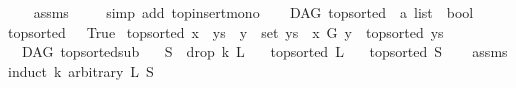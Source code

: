 \begin{isabellebody}
%
\isadelimproof
\ \ %
\endisadelimproof
%
\isatagproof
{}\isamarkupfalse%
\ assms\ \isanewline
\ \ \isamarkupfalse%
\ {\isacharparenleft}{\kern0pt}simp\ add{\isacharcolon}{\kern0pt}\ top{\isacharunderscore}{\kern0pt}insert{\isacharunderscore}{\kern0pt}mono{\isacharparenright}{\kern0pt}%
\endisatagproof
{\isafoldproof}%
%
\isadelimproof
\ \isanewline
%
\endisadelimproof
\isanewline
\isanewline
\isanewline
{}\isamarkupfalse%
\ {\isacharparenleft}{\kern0pt}\ DAG{\isacharparenright}{\kern0pt}\ top{\isacharunderscore}{\kern0pt}sorted\ {\isacharcolon}{\kern0pt}{\isacharcolon}{\kern0pt}\ {\isachardoublequoteopen}{\isacharprime}{\kern0pt}a\ list\ {\isasymRightarrow}\ bool{\isachardoublequoteclose}\ \isanewline
{\isachardoublequoteopen}top{\isacharunderscore}{\kern0pt}sorted\ {\isacharbrackleft}{\kern0pt}{\isacharbrackright}{\kern0pt}\ {\isacharequal}{\kern0pt}\ True{\isachardoublequoteclose}\ {\isacharbar}{\kern0pt}\isanewline
{\isachardoublequoteopen}top{\isacharunderscore}{\kern0pt}sorted\ {\isacharparenleft}{\kern0pt}x\ {\isacharhash}{\kern0pt}\ ys{\isacharparenright}{\kern0pt}\ {\isacharequal}{\kern0pt}\ {\isacharparenleft}{\kern0pt}{\isacharparenleft}{\kern0pt}{\isasymforall}y\ {\isasymin}\ set\ ys{\isachardot}{\kern0pt}\ {\isasymnot}\ x\ {\isasymrightarrow}\isactrlsup {\isacharplus}{\kern0pt}\isactrlbsub G\isactrlesub \ y{\isacharparenright}{\kern0pt}\ {\isasymand}\ top{\isacharunderscore}{\kern0pt}sorted\ ys{\isacharparenright}{\kern0pt}{\isachardoublequoteclose}\isanewline
\isanewline
{}\isamarkupfalse%
\ {\isacharparenleft}{\kern0pt}\ DAG{\isacharparenright}{\kern0pt}\ top{\isacharunderscore}{\kern0pt}sorted{\isacharunderscore}{\kern0pt}sub{\isacharcolon}{\kern0pt}\isanewline
\ \ \ {\isachardoublequoteopen}S\ {\isacharequal}{\kern0pt}\ drop\ k\ L{\isachardoublequoteclose}\isanewline
\ \ \ {\isachardoublequoteopen}top{\isacharunderscore}{\kern0pt}sorted\ L{\isachardoublequoteclose}\ \ \isanewline
{}\ {\isachardoublequoteopen}top{\isacharunderscore}{\kern0pt}sorted\ S{\isachardoublequoteclose}\isanewline
%
\isadelimproof
\ \ %
\endisadelimproof
%
\isatagproof
{}\isamarkupfalse%
\ assms\isanewline
{}\isamarkupfalse%
{\isacharparenleft}{\kern0pt}induct\ k\ arbitrary{\isacharcolon}{\kern0pt}\ L\ S{\isacharparenright}{\kern0pt}\isanewline
\ \ \isamarkupfalse%
\ {}\isanewline
\ \ \isamarkupfalse%
\ \isamarkupfalse%

\end{isabellebody}
